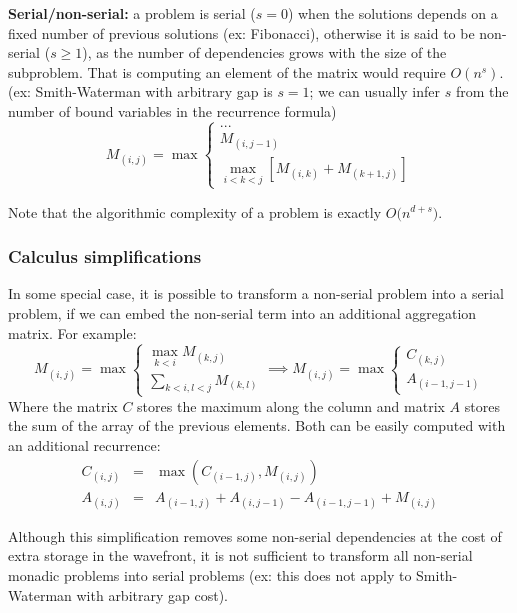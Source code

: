\item \textbf{Serial/non-serial:} a problem is serial ($s=0$) when the solutions depends on a fixed number of previous solutions (ex: Fibonacci), otherwise it is said to be non-serial ($s\ge 1$), as the number of dependencies grows with the size of the subproblem. That is computing an element of the matrix would require $O(n^s)$.  (ex: Smith-Waterman with arbitrary gap is $s=1$; we can usually infer $s$ from the number of bound variables in the recurrence formula)
	\[M_{(i,j)}=\max\left\{\begin{array}{l} ... \\ M_{(i,j-1)}\\ \max\limits_{i<k<j} [ M_{(i,k)}+M_{(k+1,j)} ] \end{array}\right. \]
\ule

Note that the algorithmic complexity of a problem is exactly $O\big(n^{d+s}\big)$.

\subsubsection{Calculus simplifications}
In some special case, it is possible to transform a non-serial problem into a serial problem, if we can embed the non-serial term into an additional aggregation matrix. For example:
	\[M_{(i,j)}=\max\left\{\begin{array}{l} \max\limits_{k<i} M_{(k,j)}
	\\ \sum\limits_{k<i, l<j}M_{(k,l)} \end{array}\right.
	\implies M_{(i,j)}=\max\left\{\begin{array}{l} C_{(k,j)} \\ A_{(i-1,j-1)} \end{array}\right.\]
Where the matrix $C$ stores the maximum along the column and matrix $A$ stores the sum of the array of the previous elements. Both can be easily computed with an additional recurrence:
	\[\begin{array}{rcl} C_{(i,j)}&=&\max(C_{(i-1,j)}, M_{(i,j)}) \\
	A_{(i,j)}&=&A_{(i-1,j)}+A_{(i,j-1)}-A_{(i-1,j-1)}+M_{(i,j)}\end{array}\]

Although this simplification removes some non-serial dependencies at the cost of extra storage in the wavefront, it is not sufficient to transform all non-serial monadic problems into serial problems (ex: this does not apply to Smith-Waterman with arbitrary gap cost).

